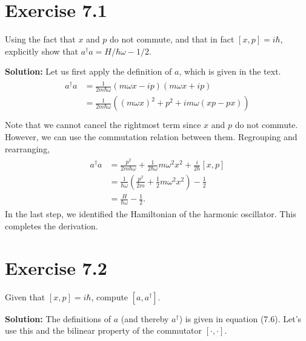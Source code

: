 \documentclass{book}
\begin{document}
\section*{Exercise 7.1}
    Using the fact that $x$ and $p$ do not commute, and that in fact $[x,p]=i\hbar$, explicitly show that $a^\dagger a= H/\hbar\omega -1/2$.
    
    \textbf{Solution:} Let us first apply the definition of $a$, which is given in the text.
    \begin{align}
    \begin{aligned}
        a^\dagger a &= \frac{1}{2m\hbar\omega}(m\omega x-ip)(m\omega x+ip) \\
        &= \frac{1}{2m\hbar\omega} \left((m\omega x)^2 + p^2 + im\omega(xp-px)\right) \\
    \end{aligned}
    \end{align}
    Note that we cannot cancel the rightmost term since $x$ and $p$ do not commute. However, we can use the commutation relation between them. Regrouping and rearranging,
    \begin{align}
    \begin{aligned}
        a^\dagger a &= \frac{p^2}{2m\hbar\omega}+\frac{1}{2\hbar\omega}m \omega^2 x^2 + \frac{i}{2\hbar} [x,p] \\
        &= \frac{1}{\hbar\omega} \left(\frac{p^2}{2m} + \frac{1}{2}m\omega^2 x^2\right) - \frac{1}{2} \\
        &= \frac{H}{\hbar\omega}-\frac{1}{2}.
    \end{aligned}
    \end{align}
    In the last step, we identified the Hamiltonian of the harmonic oscillator. This completes the derivation.
    
\section*{Exercise 7.2}
    Given that $[x,p] = i\hbar$, compute $[a, a^\dagger]$.

    \textbf{Solution:} The definitions of $a$ (and thereby $a^\dagger$) is given in equation (7.6). Let's use this and the bilinear property of the commutator $[\cdot, \cdot]$.
\end{document}
